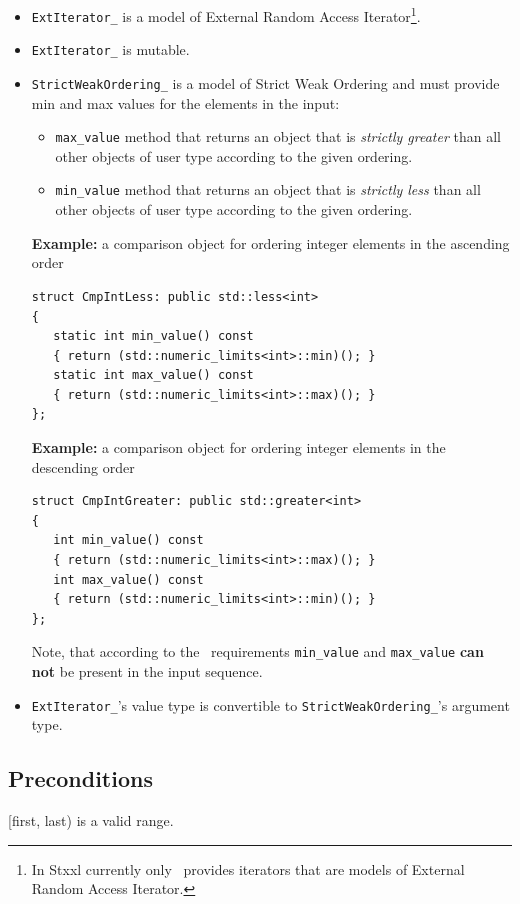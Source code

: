\documentclass[twoside]{book}
\newcommand{\stxxl}{{\sc Stxxl} }
\begin{document}
\begin{itemize}
\item \texttt{ExtIterator\_} is a model of External Random Access
Iterator\footnote{In \stxxl currently only \xvector\ provides
iterators that are models of External Random Access Iterator.}. 
\item \texttt{ExtIterator\_} is mutable.
\item \texttt{StrictWeakOrdering\_} is a model of Strict Weak Ordering
and must provide min and max values for the elements in the input:
 \begin{itemize}
 \item \texttt{max\_value} method that returns an object that is
   \emph{strictly greater} than all other objects of user type according
    to the given ordering. 
 \item \texttt{min\_value} method that returns an object that
    is \emph{strictly less} than all other objects of user type according
    to the given ordering.
 \end{itemize}
 {\bf Example:} 
  a comparison object for ordering integer elements in the ascending
  order
\begin{lstlisting}
struct CmpIntLess: public std::less<int>
{
   static int min_value() const  
   { return (std::numeric_limits<int>::min)(); }
   static int max_value() const  
   { return (std::numeric_limits<int>::max)(); }
};
 \end{lstlisting}
 {\bf Example:} 
  a comparison object for ordering integer elements in the descending
  order
\begin{lstlisting}
struct CmpIntGreater: public std::greater<int>
{
   int min_value() const  
   { return (std::numeric_limits<int>::max)(); }
   int max_value() const  
   { return (std::numeric_limits<int>::min)(); }
};
 \end{lstlisting}


 Note, that according to the \xsort\ requirements \texttt{min\_value}
and \texttt{max\_value} {\bf can not} be present in the input
sequence.
\item \texttt{ExtIterator\_}'s value type is convertible to
\texttt{StrictWeakOrdering\_}'s argument type.

\end{itemize}

\subsection*{Preconditions}
\label{sortpreconditions}
[first, last) is a valid range.
\end{document}
